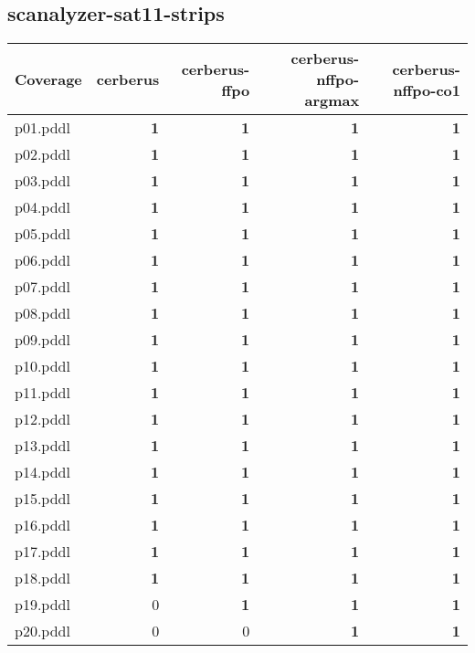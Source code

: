 \documentclass{article}
\begin{document}
\hypertarget{coverage-scanalyzer-sat11-strips}{}
\subsection*{scanalyzer-sat11-strips}

\begin{tabular}{@{}lrrrr@{}}
Coverage & cerberus & cerberus-ffpo & cerberus-nffpo-argmax & cerberus-nffpo-co1 \\
\midrule
p01.pddl & \textbf{1} & \textbf{1} & \textbf{1} & \textbf{1} \\
p02.pddl & \textbf{1} & \textbf{1} & \textbf{1} & \textbf{1} \\
p03.pddl & \textbf{1} & \textbf{1} & \textbf{1} & \textbf{1} \\
p04.pddl & \textbf{1} & \textbf{1} & \textbf{1} & \textbf{1} \\
p05.pddl & \textbf{1} & \textbf{1} & \textbf{1} & \textbf{1} \\
p06.pddl & \textbf{1} & \textbf{1} & \textbf{1} & \textbf{1} \\
p07.pddl & \textbf{1} & \textbf{1} & \textbf{1} & \textbf{1} \\
p08.pddl & \textbf{1} & \textbf{1} & \textbf{1} & \textbf{1} \\
p09.pddl & \textbf{1} & \textbf{1} & \textbf{1} & \textbf{1} \\
p10.pddl & \textbf{1} & \textbf{1} & \textbf{1} & \textbf{1} \\
p11.pddl & \textbf{1} & \textbf{1} & \textbf{1} & \textbf{1} \\
p12.pddl & \textbf{1} & \textbf{1} & \textbf{1} & \textbf{1} \\
p13.pddl & \textbf{1} & \textbf{1} & \textbf{1} & \textbf{1} \\
p14.pddl & \textbf{1} & \textbf{1} & \textbf{1} & \textbf{1} \\
p15.pddl & \textbf{1} & \textbf{1} & \textbf{1} & \textbf{1} \\
p16.pddl & \textbf{1} & \textbf{1} & \textbf{1} & \textbf{1} \\
p17.pddl & \textbf{1} & \textbf{1} & \textbf{1} & \textbf{1} \\
p18.pddl & \textbf{1} & \textbf{1} & \textbf{1} & \textbf{1} \\
p19.pddl & 0 & \textbf{1} & \textbf{1} & \textbf{1} \\
p20.pddl & 0 & 0 & \textbf{1} & \textbf{1} \\
\end{tabular}
\end{document}
